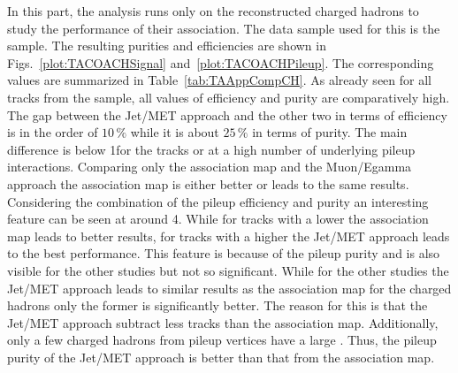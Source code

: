 In this part, the analysis runs only on the reconstructed charged hadrons to study the performance of their association. The data sample used for this is the \ttbar sample. The resulting purities and efficiencies are shown in Figs.~\ref{plot:TACOACHSignal} and~\ref{plot:TACOACHPileup}.  The corresponding values are summarized in Table~\ref{tab:TAAppCompCH}. As already seen for all tracks from the \ttbar sample, all values of efficiency and purity are comparatively high. The gap between the Jet/MET approach and the other two in terms of efficiency is in the order of $10\,\%$ while it is about $25\,\%$ in terms of purity. The main difference is below 1\GeV for the tracks \pt or at a high number of underlying pileup interactions. Comparing only the association map and the Muon/Egamma approach the association map is either better or leads to the same results. \\
Considering the combination of the pileup efficiency and purity an interesting feature can be seen at around 4\GeV{}. While for tracks with a lower \pt{} the association map leads to better results, for tracks with a higher \pt{} the Jet/MET approach leads to the best performance. This feature is because of the pileup purity and is also visible for the other studies but not so significant. While for the other studies the Jet/MET approach leads to similar results as the association map for the charged hadrons only the former is significantly better. The reason for this is that the Jet/MET approach subtract less tracks than the association map. Additionally, only a few charged hadrons from pileup vertices have a large \pt{}. Thus, the pileup purity of the Jet/MET approach is better than that from the association map.

